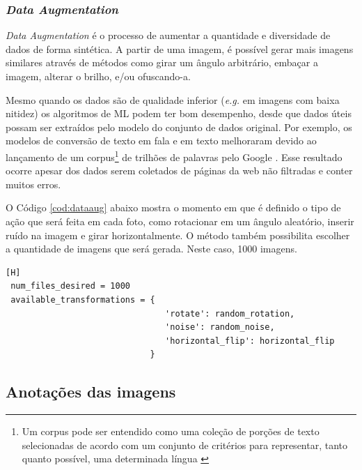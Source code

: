 
\subsubsection*{\textit{Data Augmentation}}\label{sec:dataAugm}

\textit{Data Augmentation} é o processo de aumentar a quantidade e diversidade de dados de forma sintética. A partir de uma imagem, é possível gerar mais imagens similares através de métodos como girar um ângulo arbitrário, embaçar a imagem, alterar o brilho, e/ou ofuscando-a.

Mesmo quando os dados são de qualidade inferior (\textit{e.g.} em imagens com baixa nitidez) os algoritmos de ML podem ter bom desempenho, desde que dados úteis possam ser extraídos pelo modelo do conjunto de dados original. Por exemplo, os modelos de conversão de texto em fala e em texto melhoraram devido ao lançamento de um corpus\footnote{Um corpus pode ser entendido como uma coleção de porções de texto selecionadas de acordo com um conjunto de critérios para representar, tanto quanto possível, uma determinada língua \cite{sinclair2005corpus}} de trilhões de palavras pelo Google \cite{halevy2009unreasonable}. Esse resultado ocorre apesar dos dados serem coletados de páginas da web não filtradas e conter muitos erros.\cite{dataAug}

O Código \ref{cod:dataaug} abaixo mostra o momento em que é definido o tipo de ação que será feita em cada foto, como rotacionar em um ângulo aleatório, inserir ruído na imagem e girar horizontalmente. O método também possibilita escolher a quantidade de imagens que será gerada. Neste caso, 1000 imagens.

\begin{lstlisting}[caption=Exemplo de código do método \textit{data augmentation}, label=cod:dataaug][H]
 num_files_desired = 1000
 available_transformations = {
                                'rotate': random_rotation,
                                'noise': random_noise,
                                'horizontal_flip': horizontal_flip
                             }
\end{lstlisting}


\subsection{Anotações das imagens}

